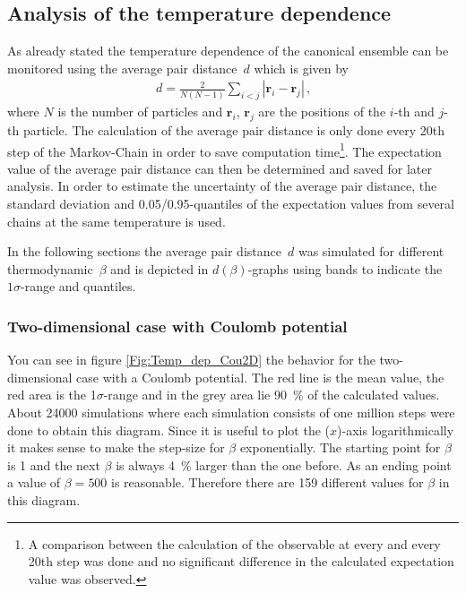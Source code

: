\documentclass[11pt, a4paper]{article}
\numberwithin{equation}{section}
\newcommand{\remark}[1]{{\color{red}(#1)}}
\begin{document}
\subsection{Analysis of the temperature dependence} \label{sec:Temp_Dep}
As already stated the temperature dependence of the canonical ensemble can be monitored using the average pair distance~$d$ which is given by
\begin{align*}
d = \frac{2}{N(N - 1)} \sum_{i<j} |\mathbf{r}_i - \mathbf{r}_j | \, \text{,}
\end{align*}
where $N$ is the number of particles and $\mathbf{r}_i$, $\mathbf{r}_j$ are the positions of the $i$-th and $j$-th particle.
The calculation of the average pair distance is only done every 20th step of the Markov-Chain in order to save computation time\footnote{A comparison between the calculation of the observable at every and every 20th step was done and no significant difference in the calculated expectation value was observed.}.
The expectation value of the average pair distance can then be determined and saved for later analysis.
In order to estimate the uncertainty of the average pair distance, the standard deviation and 0.05/0.95-quantiles of the expectation values from several chains at the same temperature is used.

In the following sections the average pair distance~$d$ was simulated for different thermodynamic~$\beta$ and is depicted in $d(\beta)$-graphs using bands to indicate the $1\sigma$-range and quantiles.

\subsubsection{Two-dimensional case with Coulomb potential} \label{sec:2d_coulomb_tempdep}
You can see in figure \ref{Fig:Temp_dep_Cou2D} the behavior for the two-dimensional case with a Coulomb potential.
The red line is the mean value, the red area is the 1$\sigma$-range and in the grey area lie \SI{90}{\percent} of the calculated values.
About 24000 simulations where each simulation consists of one million steps were done to obtain this diagram.
Since it is useful to plot the \remark{$x$}-axis logarithmically it makes sense to make the step-size for $\beta$ exponentially.
The starting point for $\beta$ is 1 and the next $\beta$ is always \SI{4}{\percent} larger than the one before.
As an ending point a value of $\beta=500$ is reasonable.
Therefore there are 159 different values for $\beta$ in this diagram.
\end{document}
